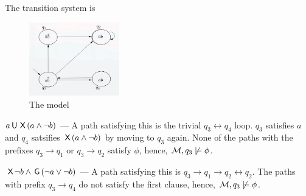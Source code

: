\question The transition system is 

\begin{figure}[ht]
    \centering
    \includegraphics[width=0.35\textwidth]{fig/q2ts.png}
    \caption{The model}
    \label{fig:q2ts}
\end{figure}

\begin{alphaparts}
    \setcounter{partCounter}{2}

    \questionpart $a \,\textsf{U}\, \,\textsf{X}\, (a \land \lnot b)$ --- A path satisfying this
    is the trivial $q_3 \leftrightarrow q_4$ loop. $q_3$ satisfies $a$ and $q_4$
    satsifies $\,\textsf{X}\, (a \land \lnot b)$ by moving to $q_3$ again. None of the
    paths with the prefixes $q_3 \rightarrow q_1$ or $q_3 \rightarrow q_2$
    satisfy $\phi$, hence, $\mathcal{M}, q_3 \not \models \phi$.

    \questionpart $\,\textsf{X}\, \lnot b \land \,\textsf{G}\, (\lnot a \lor \lnot b)$ --- A
    path satisfying this is $q_3 \rightarrow q_1 \rightarrow q_2 \leftrightarrow
    q_2$. The paths with prefix $q_3 \rightarrow q_4$ do not satisfy the first
    clause, hence, $\mathcal{M}, q_3 \not\models \phi$.
\end{alphaparts}